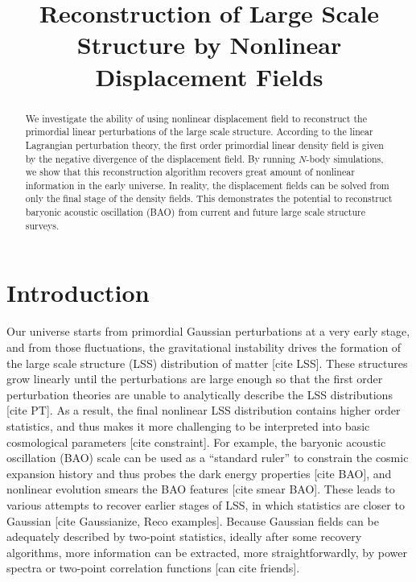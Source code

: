 \documentclass[aps,prd,twocolumn,superscriptaddress,amsfont,amssymb,amsmath,nofootinbib,showpacs,balancelastpage]{revtex4-1}
\begin{document}
\addtolength{\hoffset}{-0.525cm}
\addtolength{\textwidth}{1.05cm}
\title{Reconstruction of Large Scale Structure by Nonlinear Displacement Fields}




\begin{abstract}
We investigate the ability of using nonlinear displacement field to reconstruct 
the primordial linear perturbations of the large scale structure. According to 
the linear Lagrangian perturbation theory, the first order primordial linear 
density field is given by the negative divergence of the displacement field. By 
running $N$-body simulations, we show that this reconstruction algorithm recovers 
great amount of nonlinear information in the early universe. In reality, the 
displacement fields can be solved from only the final stage of the density 
fields. This demonstrates the potential to reconstruct baryonic acoustic oscillation (BAO) 
from current and future large scale structure surveys.

\end{abstract}


\maketitle

\section{Introduction}\label{sec.intro}
Our universe starts from primordial Gaussian perturbations at a very early stage, 
and from those fluctuations, the gravitational instability drives the formation of 
the large scale structure (LSS) distribution of matter [cite LSS]. These structures grow 
linearly until the perturbations are large enough so that the first order 
perturbation theories are unable to analytically describe the LSS distributions [cite PT]. 
As a result, the final nonlinear LSS distribution contains higher order 
statistics, and thus makes it more challenging to be interpreted into basic
cosmological parameters [cite constraint]. For example, the baryonic acoustic oscillation (BAO)
scale can be used as a ``standard ruler'' to constrain the cosmic expansion history
and thus probes the dark energy properties [cite BAO], and nonlinear evolution smears the BAO
features [cite smear BAO]. These leads to various attempts to recover earlier stages of LSS, in 
which statistics are closer to Gaussian [cite Gaussianize, Reco examples].
Because Gaussian fields can be adequately described by two-point statistics,
ideally after some recovery algorithms, more information can be extracted,
more straightforwardly, by power spectra or two-point correlation functions [can cite friends].
\end{document}
